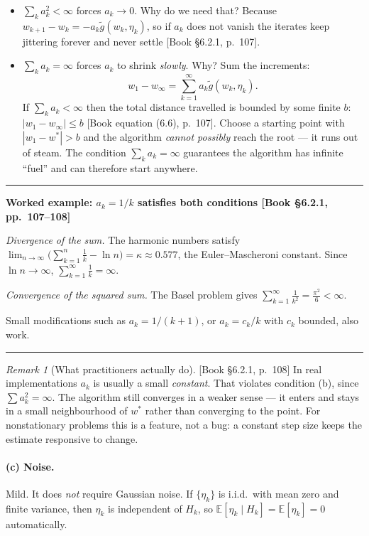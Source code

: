 \documentclass[11pt, letterpaper]{article}
\theoremstyle{runin}
\theoremstyle{runinplain}
\theoremstyle{remark}
\newtheorem*{remark}{Remark}
\newcommand{\E}{\mathbb{E}}
\newcommand{\bkin}[1]{{\color{bookblue}\small[\textsf{Book #1}]}}
\newenvironment{worked}[1]
  {\par\medskip\noindent\rule{\textwidth}{0.4pt}\par\nobreak\vspace{0.3em}
   \noindent\textbf{Worked example: #1}\par\nobreak\vspace{0.2em}\small}
  {\par\nobreak\vspace{0.3em}\noindent\rule{\textwidth}{0.4pt}\par\medskip}
\begin{document}
\begin{itemize}
  \item $\sum_k a_k^2<\infty$ forces $a_k\to0$. Why do we need that? Because
        $w_{k+1}-w_k=-a_k\tilde g(w_k,\eta_k)$, so if $a_k$ does not vanish the
        iterates keep jittering forever and never settle
        \bkin{\S6.2.1, p.~107}.
  \item $\sum_k a_k=\infty$ forces $a_k$ to shrink \emph{slowly}. Why? Sum the
        increments:
        \[
          w_1-w_\infty=\sum_{k=1}^\infty a_k\tilde g(w_k,\eta_k).
        \]
        If $\sum_k a_k<\infty$ then the total distance travelled is bounded by some
        finite $b$: $|w_1-w_\infty|\le b$ \bkin{equation (6.6), p.~107}. Choose a
        starting point with $|w_1-w^*|>b$ and the algorithm \emph{cannot possibly}
        reach the root --- it runs out of steam. The condition
        $\sum_k a_k=\infty$ guarantees the algorithm has infinite ``fuel'' and can
        therefore start anywhere.
\end{itemize}

\begin{worked}{$a_k=1/k$ satisfies both conditions \bkin{\S6.2.1, pp.~107--108}}
\emph{Divergence of the sum.} The harmonic numbers satisfy
$\lim_{n\to\infty}\bigl(\sum_{k=1}^n\frac1k-\ln n\bigr)=\kappa\approx0.577$, the
Euler--Mascheroni constant. Since $\ln n\to\infty$,
$\sum_{k=1}^\infty\frac1k=\infty$. \checkmark

\emph{Convergence of the squared sum.} The Basel problem gives
$\sum_{k=1}^\infty\frac1{k^2}=\frac{\pi^2}{6}<\infty$. \checkmark

Small modifications such as $a_k=1/(k+1)$, or $a_k=c_k/k$ with $c_k$ bounded, also
work.
\end{worked}

\begin{remark}[What practitioners actually do]
\bkin{\S6.2.1, p.~108} In real implementations $a_k$ is usually a small
\emph{constant}. That violates condition (b), since
$\sum a_k^2=\infty$. The algorithm still converges in a weaker sense --- it enters
and stays in a small neighbourhood of $w^*$ rather than converging to the point.
For nonstationary problems this is a feature, not a bug: a constant step size keeps
the estimate responsive to change.
\end{remark}

\paragraph{(c) Noise.} Mild. It does \emph{not} require Gaussian noise. If
$\{\eta_k\}$ is i.i.d.\ with mean zero and finite variance, then $\eta_k$ is
independent of $H_k$, so $\E[\eta_k\mid H_k]=\E[\eta_k]=0$ automatically.
\end{document}
